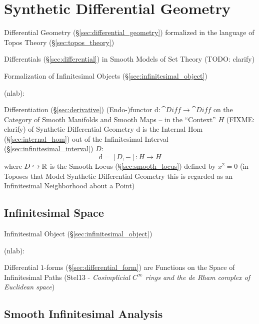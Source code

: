 \section{Synthetic Differential Geometry}
\label{sec:synthetic_differential_geometry}

Differential Geometry (\S\ref{sec:differential_geometry}) formalized in the
language of Topos Theory (\S\ref{sec:topos_theory})

Differentials (\S\ref{sec:differential}) in Smooth Models of Set Theory
(TODO: clarify)

Formalization of Infinitesimal Objects (\S\ref{sec:infinitesimal_object})

(nlab):

Differentiation (\S\ref{sec:derivative}) (Endo-)functor $\mathrm{d} : \cat{Diff}
\rightarrow \cat{Diff}$ on the Category of Smooth Manifolds and Smooth Maps --
in the ``Context'' $H$ (FIXME: clarify) of Synthetic Differential Geometry
$\mathrm{d}$ is the Internal Hom (\S\ref{sec:internal_hom}) out of the
Infinitesimal Interval (\S\ref{sec:infinitesimal_interval}) $D$:
\[
  \mathrm{d} = [D,-] : H \rightarrow H
\]
where $D \hookrightarrow \mathbb{R}$ is the Smooth Locus (\S\ref{sec:smooth_locus})
defined by $x^2 = 0$ (in Toposes that Model Synthetic Differential Geometry this
is regarded as an Infinitesimal Neighborhood about a Point)



\subsection{Infinitesimal Space}\label{sec:infinitesimal_space}

\fist Infinitesimal Object (\S\ref{sec:infinitesimal_object})

(nlab):

Differential $1$-forms (\S\ref{sec:differential_form}) are Functions on the
Space of Infinitesimal Paths (Stel13 - \emph{Cosimplicial $C^\infty$ rings and
  the de Rham complex of Euclidean space})



\subsection{Smooth Infinitesimal Analysis}
\label{sec:smooth_infinitesimal_analysis}



